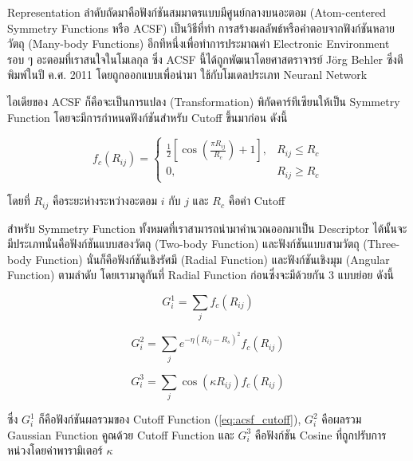 Representation ลำดับถัดมาคือฟังก์ชันสมมาตรแบบมีศูนย์กลางบนอะตอม (Atom-centered Symmetry Functions หรือ ACSF) เป็นวิธีที่ทำ%
การสร้างผลลัพธ์หรือคำตอบจากฟังก์ชันหลายวัตถุ (Many-body Functions) อีกทีหนึ่งเพื่อทำการประมาณค่า Electronic Environment รอบ ๆ 
อะตอมที่เราสนใจในโมเลกุล ซึ่ง ACSF นี้ได้ถูกพัฒนาโดยศาสตราจารย์ J{\"o}rg Behler ซึ่งตีพิมพ์ในปี ค.ศ. 2011 โดยถูกออกแบบเพื่อนำมา%
ใช้กับโมเดลประเภท Neuranl Network \autocite{behler2011a}

ไอเดียของ ACSF ก็คือจะเป็นการแปลง (Transformation) พิกัดคาร์ทีเซียนให้เป็น Symmetry Function โดยจะมีการกำหนดฟังก์ชันสำหรับ 
Cutoff ขึ้นมาก่อน ดังนี้

\begin{equation}\label{eq:acsf_cutoff}
    f_{c}(R_{ij}) = 
    \begin{cases}
        \frac{1}{2}[\cos(\frac{\pi R_{ij}}{R_{c}}) + 1], & R_{ij} \le R_{c} \\
        0,                                             & R_{ij} \ge R_{c}
    \end{cases}
\end{equation}

\noindent โดยที่ $R_{ij}$ คือระยะห่างระหว่างอะตอม $i$ กับ $j$ และ $R_{c}$ คือค่า Cutoff

สำหรับ Symmetry Function ทั้งหมดที่เราสามารถนำมาคำนวณออกมาเป็น Descriptor ได้นั้นจะมีประเภทนั่นคือฟังก์ชันแบบสองวัตถุ
(Two-body Function) และฟังก์ชันแบบสามวัตถุ (Three-body Function) นั่นก็คือฟังก์ชันเชิงรัศมี (Radial Function) และฟังก์ชันเชิงมุม 
(Angular Function) ตามลำดับ โดยเรามาดูกันที่ Radial Function ก่อนซึ่งจะมีด้วยกัน 3 แบบย่อย ดังนี้

\begin{equation}\label{eq:rf_g1}
    G^{1}_{i} = \sum_{j} f_{c}(R_{ij})
\end{equation}

\begin{equation}\label{eq:rf_g2}
    G^{2}_{i} = \sum_{j} e^{-\eta(R_{ij} - R_{s})^{2}} f_{c}(R_{ij})
\end{equation}

\begin{equation}\label{eq:rf_g3}
    G^{3}_{i} = \sum_{j} \cos(\kappa R_{ij}) f_{c}(R_{ij})
\end{equation}

\noindent ซึ่ง $G^{1}_{i}$ ก็คือฟังก์ชันผลรวมของ Cutoff Function (\ref{eq:acsf_cutoff}), $G^{2}_{i}$ คือผลรวม Gaussian 
Function คูณด้วย Cutoff Function และ $G^{3}_{i}$ คือฟังก์ชัน Cosine ที่ถูกปรับการหน่วงโดยค่าพารามิเตอร์ $\kappa$ 

